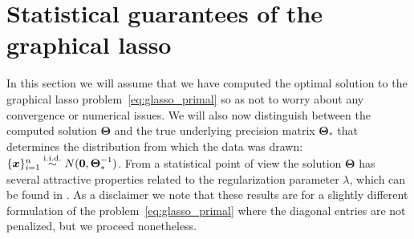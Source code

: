 \documentclass[10pt, letterpaper]{article}
\newcommand{\bx}{\boldsymbol x} %
\newcommand{\preci}{\boldsymbol \Theta}
\newcommand{\iid}{\stackrel{\mathrm{i.i.d.}}{\sim}}
\newcommand{\bzero}{{\bf 0}}
\begin{document}
\section{Statistical guarantees of the graphical lasso}

In this section we will assume that we have computed the optimal solution to the graphical lasso problem~\ref{eq:glasso_primal} so as not to worry about any convergence or numerical issues.  We will also now distinguish between the computed solution $\preci$ and the true underlying precision matrix $\preci_*$ that determines the distribution from which the data was drawn: $\{\bx\}_{i=1}^n \iid N(\bzero, \preci_*^{-1})$.  From a statistical point of view the solution $\preci$ has several attractive properties related to the regularization parameter $\lambda$, which can be found in \cite{Wainwright}.  As a disclaimer we note that these results are for a slightly different formulation of the problem~\ref{eq:glasso_primal} where the diagonal entries are not penalized, but we proceed nonetheless.\\
\end{document}
